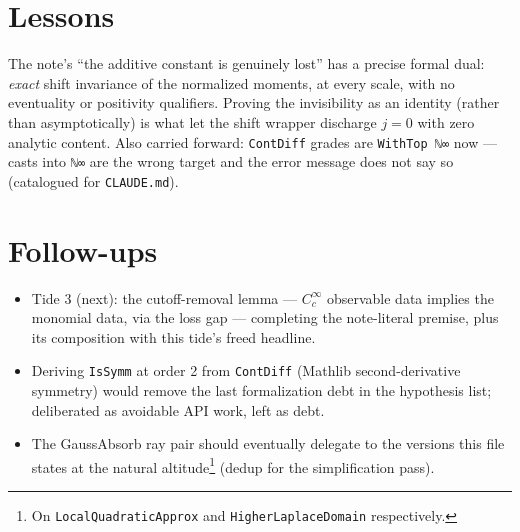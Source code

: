 \documentclass[11pt]{article}
\begin{document}
\section{Lessons}

The note's ``the additive constant is genuinely lost'' has a precise
formal dual: \emph{exact} shift invariance of the normalized moments, at
every scale, with no eventuality or positivity qualifiers. Proving the
invisibility as an identity (rather than asymptotically) is what let the
shift wrapper discharge $j=0$ with zero analytic content. Also carried
forward: \texttt{ContDiff} grades are \texttt{WithTop ℕ∞} now --- casts
into \texttt{ℕ∞} are the wrong target and the error message does not say
so (catalogued for \texttt{CLAUDE.md}).

\section{Follow-ups}

\begin{itemize}[nosep]
\item Tide 3 (next): the cutoff-removal lemma --- $C_c^\infty$ observable
data implies the monomial data, via the loss gap --- completing the
note-literal premise, plus its composition with this tide's freed
headline.
\item Deriving \texttt{IsSymm} at order 2 from \texttt{ContDiff} (Mathlib
second-derivative symmetry) would remove the last formalization debt in
the hypothesis list; deliberated as avoidable API work, left as debt.
\item The GaussAbsorb ray pair should eventually delegate to the
versions this file states at the natural altitude\footnote{On
\texttt{LocalQuadraticApprox} and \texttt{HigherLaplaceDomain}
respectively.} (dedup for the simplification pass).
\end{itemize}
\end{document}
